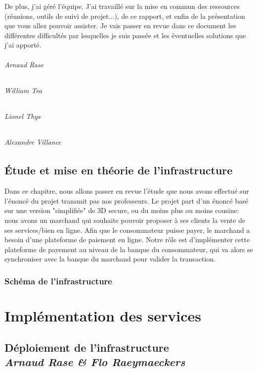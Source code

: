 \documentclass[11pt]{report}
\newcommand\Chapter[2]{
  \chapter[#1: {\itshape#2}]{#1\\[2ex]\large\itshape#2}
}
\begin{document}
De plus, j'ai géré l'équipe. J'ai travaillé sur la mise en commun des ressources (réunions, outils de suivi de projet...), de ce rapport, et enfin de la présentation que vous allez pouvoir assister. Je vais passer en revue dans ce document les différentes difficultés par lesquelles je suis passée et les éventuelles solutions que j'ai apporté.

\paragraph{Arnaud Rase}
\paragraph{William Tea}
\paragraph{Lionel Thys}
\paragraph{Alexandre Villance}

\chapter{Étude et mise en théorie de l'infrastructure}

Dans ce chapitre, nous allons passer en revue l'étude que nous avons effectué sur l'énoncé du projet transmit pas nos professeurs. Le projet part d'un énoncé basé sur une version "simplifiée" de 3D secure, ou du moins plus ou moins cousine: nous avons un marchand qui souhaite pouvoir proposer à ses clients la vente de ses services/bien en ligne. Afin que le consommateur puisse payer, le marchand a besoin d'une plateforme de paiement en ligne. Notre rôle est d'implémenter cette plateforme de payement au niveau de la banque du consommateur, qui va alors se synchroniser avec la banque du marchand pour valider la transaction.

\section{Schéma de l'infrastructure}

\part{Implémentation des services}


\Chapter{Déploiement de l'infrastructure}{Arnaud Rase \& Flo Raeymaeckers}
\end{document}

